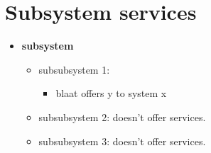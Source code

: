 \chapter{Subsystem services}
\thispagestyle{fancy}

\begin{itemize}
\item \textbf{subsystem}
	\begin{itemize}
	\item subsubsystem 1:\begin{itemize}
				\item blaat offers y to system x
				\end{itemize}
	\item subsubsystem 2: doesn't offer services.
	\item subsubsystem 3: doesn't offer services.
	\end{itemize}
\end{itemize}